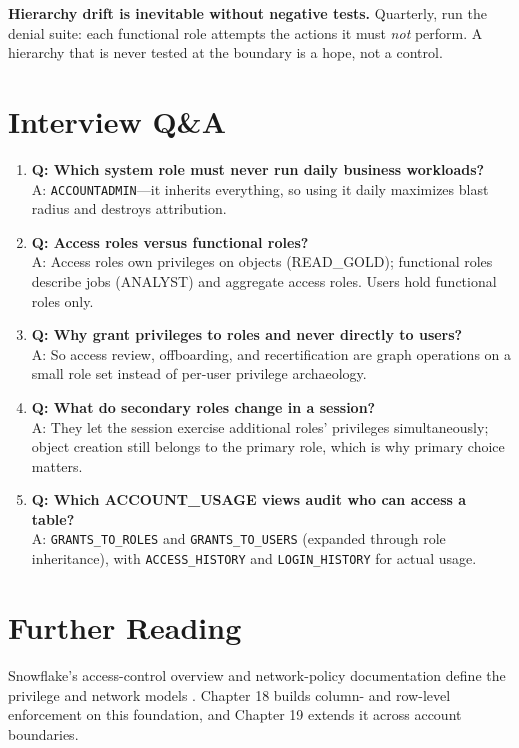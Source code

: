 \begin{pitfall}
\textbf{Hierarchy drift is inevitable without negative tests.} Quarterly, run the denial suite: each functional role attempts the actions it must \emph{not} perform. A hierarchy that is never tested at the boundary is a hope, not a control.
\end{pitfall}

\section{Interview Q\&A}
\begin{enumerate}
    \item \textbf{Q: Which system role must never run daily business workloads?}\\
    A: \texttt{ACCOUNTADMIN}---it inherits everything, so using it daily maximizes blast radius and destroys attribution.
    \item \textbf{Q: Access roles versus functional roles?}\\
    A: Access roles own privileges on objects (READ\_GOLD); functional roles describe jobs (ANALYST) and aggregate access roles. Users hold functional roles only.
    \item \textbf{Q: Why grant privileges to roles and never directly to users?}\\
    A: So access review, offboarding, and recertification are graph operations on a small role set instead of per-user privilege archaeology.
    \item \textbf{Q: What do secondary roles change in a session?}\\
    A: They let the session exercise additional roles' privileges simultaneously; object creation still belongs to the primary role, which is why primary choice matters.
    \item \textbf{Q: Which ACCOUNT\_USAGE views audit who can access a table?}\\
    A: \texttt{GRANTS\_TO\_ROLES} and \texttt{GRANTS\_TO\_USERS} (expanded through role inheritance), with \texttt{ACCESS\_HISTORY} and \texttt{LOGIN\_HISTORY} for actual usage.
\end{enumerate}

\section{Further Reading}
Snowflake's access-control overview and network-policy documentation define the privilege and network models \cite{snowflakeAccessControlDocs,snowflakeNetworkPoliciesDocs}. Chapter 18 builds column- and row-level enforcement on this foundation, and Chapter 19 extends it across account boundaries.

